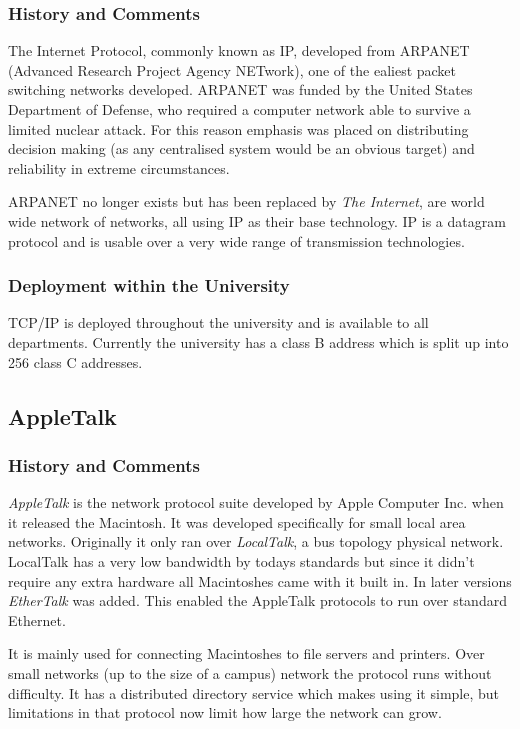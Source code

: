 \subsubsection{History and Comments}

The Internet Protocol, commonly known as IP, developed from ARPANET
(Advanced Research Project Agency NETwork), one of the ealiest packet
switching networks developed.  ARPANET was funded by the United States
Department of Defense, who required a computer network able to survive a
limited nuclear attack.  For this reason emphasis was placed on
distributing decision making (as any centralised system would be an
obvious target) and reliability in extreme circumstances.

ARPANET no longer exists but has been replaced by {\em The Internet},
are world wide network of networks, all using IP as their base
technology.  IP is a datagram protocol and is usable over a very wide
range of transmission technologies.

\subsubsection{Deployment within the University}

TCP/IP is deployed throughout the university and is available to all
departments.  Currently the university has a class B address which is
split up into 256 class C addresses.

\subsection{AppleTalk}

\subsubsection{History and Comments}

{\em AppleTalk} is the network protocol suite developed by Apple
Computer Inc. when it released the Macintosh.  It was developed
specifically for small local area networks.  Originally it only ran
over {\em LocalTalk}, a bus topology physical network.  LocalTalk has
a very low bandwidth by todays standards but since it didn't require
any extra hardware all Macintoshes came with it built in.  In later
versions {\em EtherTalk} was added.  This enabled the AppleTalk
protocols to run over standard Ethernet.

It is mainly used for connecting Macintoshes to file servers and
printers.  Over small networks (up to the size of a campus) network
the protocol runs without difficulty.  It has a distributed directory
service which makes using it simple, but limitations in that protocol
now limit how large the network can grow.

